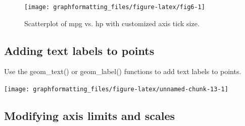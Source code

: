 \documentclass[
]{book}
\newenvironment{Shaded}{\begin{snugshade}}{\end{snugshade}}
\newcommand{\AttributeTok}[1]{\textcolor[rgb]{0.13,0.29,0.53}{#1}}
\newcommand{\ConstantTok}[1]{\textcolor[rgb]{0.56,0.35,0.01}{#1}}
\newcommand{\FloatTok}[1]{\textcolor[rgb]{0.00,0.00,0.81}{#1}}
\newcommand{\FunctionTok}[1]{\textcolor[rgb]{0.13,0.29,0.53}{\textbf{#1}}}
\newcommand{\NormalTok}[1]{#1}
\newcommand{\OtherTok}[1]{\textcolor[rgb]{0.56,0.35,0.01}{#1}}
\newcommand{\SpecialCharTok}[1]{\textcolor[rgb]{0.81,0.36,0.00}{\textbf{#1}}}
\newcommand{\StringTok}[1]{\textcolor[rgb]{0.31,0.60,0.02}{#1}}
\begin{document}
\begin{figure}
\texttt{[image: graphformatting\_files/figure-latex/fig6-1]} \caption{Scatterplot of mpg vs. hp with customized axis tick size.}\label{fig:fig6}
\end{figure}

\hypertarget{adding-text-labels-to-points}{%
\subsection{Adding text labels to points}\label{adding-text-labels-to-points}}

Use the geom\_text() or geom\_label() functions to add text labels to points.

\begin{Shaded}
\end{Shaded}

\texttt{[image: graphformatting\_files/figure-latex/unnamed-chunk-13-1]}

\hypertarget{modifying-axis-limits-and-scales}{%
\subsection{Modifying axis limits and scales}\label{modifying-axis-limits-and-scales}}
\end{document}
